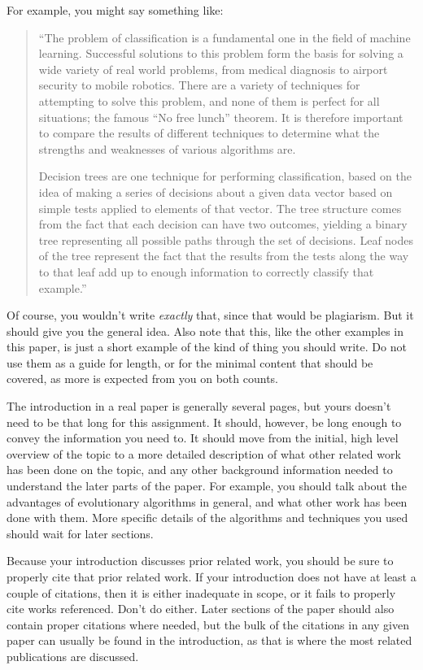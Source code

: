 \documentclass[12pt,letterpaper]{article}
\begin{document}
For example, you might say something like: 
\begin{quote}
``The problem of classification is a fundamental one in the field of machine
learning.  Successful solutions to this problem form the basis for solving a wide
variety of real world problems, from medical diagnosis to airport security to
mobile robotics.  There are a variety of techniques for attempting to solve this
problem, and none of them is perfect for all situations; the famous ``No free
lunch'' theorem\cite{aima}.  It is therefore important to compare the
results of different techniques to determine what the strengths and weaknesses
of various algorithms are. 

Decision trees are one technique for performing classification, based on the
idea of making a series of decisions about a given data vector based on simple
tests applied to elements of that vector.  The tree structure comes from the
fact that each decision can have two outcomes, yielding a binary tree
representing all possible paths through the set of decisions.  Leaf nodes of the
tree represent the fact that the results from the tests along the way to that
leaf add up to enough information to correctly classify that example.''
\end{quote}

Of course, you wouldn't write \emph{exactly} that, since that would be
plagiarism.  But it should give you the general idea.  Also note that this, like
the other examples in this paper, is just a short example of the kind of thing
you should write.  Do not use them as a guide for length, or for the minimal
content that should be covered, as more is expected from you on both counts.

The introduction in a real paper is generally several pages, but yours doesn't
need to be that long for this assignment.  It should, however, be long enough to
convey the information you need to.  It should move from the initial, high level
overview of the topic to a more detailed description of what other related work
has been done on the topic, and any other background information needed to
understand the later parts of the paper.  For example, you should talk about the
advantages of evolutionary algorithms in general, and what other work has been
done with them.  More specific details of the algorithms and techniques you used
should wait for later sections.

Because your introduction discusses prior related work, you should be sure to
properly cite that prior related work.  If your introduction does not have at
least a couple of citations, then it is either inadequate in scope, or it fails
to properly cite works referenced.  Don't do either.  Later sections of the
paper should also contain proper citations where needed, but the bulk of the
citations in any given paper can usually be found in the introduction, as that
is where the most related publications are discussed.
\end{document}
